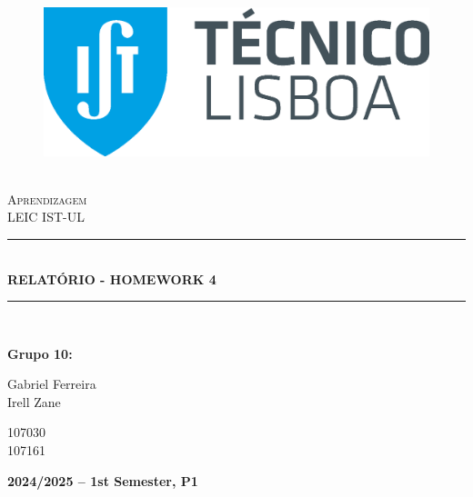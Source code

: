 \documentclass{article}
\newcommand{\HRule}[1]{\rule{\linewidth}{#1}}
\begin{document}
\begin{center}
  \begin{figure}
    \includegraphics[scale = 0.3, left]{img/IST_A.eps} %
    \end{figure}
  \LARGE{ \normalsize \textsc{} \\
  [2.0cm] 
  \LARGE{ \LARGE \textsc{Aprendizagem}} \\
  [1cm]
  \LARGE{ \LARGE \textsc{LEIC IST-UL}} \\
  [1cm]
  \HRule{1.5pt} \\
  [0.4cm]
  \LARGE \textbf{\uppercase{Relatório - Homework 4}}
  \HRule{1.5pt}
  \\ [2.5cm]
  }
\end{center}

\begin{flushleft}
  \textbf{\LARGE Grupo 10:}
\end{flushleft}

\begin{center}
  \begin{minipage}{0.7\textwidth}
      \begin{flushleft}
        \large Gabriel Ferreira \\
        \large  Irell Zane
      \end{flushleft}
  \end{minipage}%
  \begin{minipage}{0.3\textwidth}
      \begin{flushright}
        \large 107030\\
        \large 107161
      \end{flushright}
  \end{minipage}
\end{center}

\begin{center}
  \vspace{4cm}
  \date \large \bf  2024/2025 -- 1st Semester, P1
\end{center}
\end{document}
